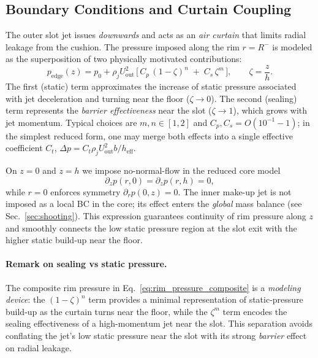 \documentclass[11pt,a4paper]{article}
\begin{document}
\subsection{Boundary Conditions and Curtain Coupling}
The outer slot jet issues \emph{downwards} and acts as an \emph{air curtain} that
limits radial leakage from the cushion. The pressure imposed along the rim
$r=R^{-}$ is modeled as the superposition of two physically motivated
contributions:
\begin{equation}
  p_{\mathrm{edge}}(z)
  = p_0 + \rho_j U_{\mathrm{out}}^2\,
    \big[\, C_p\, (1-\zeta)^{n} \;+\; C_s\, \zeta^{m} \,\big],
  \qquad \zeta=\frac{z}{h}.
  \label{eq:rim_pressure_composite}
\end{equation}
The first (static) term approximates the increase of static pressure associated with
jet deceleration and turning near the floor ($\zeta\!\to\!0$). The second (sealing)
term represents the \emph{barrier effectiveness} near the slot ($\zeta\!\to\!1$),
which grows with jet momentum. Typical choices are $m,n\in[1,2]$ and
$C_p,C_s=O(10^{-1}\!\!-\!1)$; in the simplest reduced form, one may merge both
effects into a single effective coefficient $C_t$,
$\Delta p = C_t \rho_j U_{\mathrm{out}}^2 b / h_{\mathrm{eff}}$.

On $z=0$ and $z=h$ we impose no-normal-flow in the reduced core model
\begin{equation}
  \partial_z p(r,0)=\partial_z p(r,h)=0,
\end{equation}
while $r=0$ enforces symmetry $\partial_r p(0,z)=0$. The inner make-up jet is not
imposed as a local BC in the core; its effect enters the \emph{global} mass balance
(see Sec.~\ref{sec:shooting}).
This expression guarantees continuity of rim pressure along $z$ and smoothly connects
the low static pressure region at the slot exit with the higher static build-up near the
floor.

\paragraph{Remark on sealing vs static pressure.}
The composite rim pressure in Eq.~\eqref{eq:rim_pressure_composite} is a
\emph{modeling device}: the $(1-\zeta)^n$ term provides a minimal representation
of static-pressure build-up as the curtain turns near the floor, while the
$\zeta^m$ term encodes the sealing effectiveness of a high-momentum jet near the slot.
This separation avoids conflating the jet’s low static pressure near the slot with
its strong \emph{barrier} effect on radial leakage.
\end{document}
